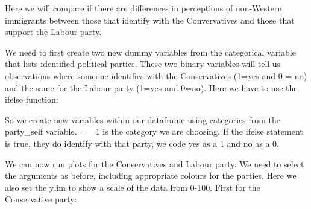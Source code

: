 \documentclass[]{article}
\newenvironment{Shaded}{\begin{snugshade}}{\end{snugshade}}
\newcommand{\DataTypeTok}[1]{\textcolor[rgb]{0.13,0.29,0.53}{#1}}
\newcommand{\DecValTok}[1]{\textcolor[rgb]{0.00,0.00,0.81}{#1}}
\newcommand{\KeywordTok}[1]{\textcolor[rgb]{0.13,0.29,0.53}{\textbf{#1}}}
\newcommand{\NormalTok}[1]{#1}
\newcommand{\OperatorTok}[1]{\textcolor[rgb]{0.81,0.36,0.00}{\textbf{#1}}}
\newcommand{\OtherTok}[1]{\textcolor[rgb]{0.56,0.35,0.01}{#1}}
\newcommand{\StringTok}[1]{\textcolor[rgb]{0.31,0.60,0.02}{#1}}
\begin{document}
Here we will compare if there are differences in perceptions of non-Western immigrants between those that identify with the Convervatives and those that support the Labour party.

We need to first create two new dummy variables from the categorical variable that lists identified political parties. These two binary variables will tell us observations where someone identifies with the Conservatives (1=yes and 0 = no) and the same for the Labour party (1=yes and 0=no). Here we have to use the ifelse function:

\begin{Shaded}
\end{Shaded}

So we create new variables within our dataframe using categories from the party\_self variable. == 1 is the category we are choosing. If the ifelse statement is true, they do identify with that party, we code yes as a 1 and no as a 0.

We can now run plots for the Conservatives and Labour party. We need to select the arguments as before, including appropriate colours for the parties. Here we also set the ylim to show a scale of the data from 0-100. First for the Conservative party:

\begin{Shaded}
\end{Shaded}
\end{document}
